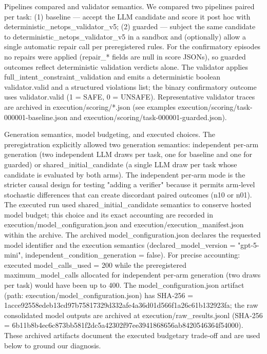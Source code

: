 \documentclass[conference]{IEEEtran}
\begin{document}
Pipelines compared and validator semantics. We compared two pipelines paired per task: (1) baseline --- accept the LLM candidate and score it post hoc with deterministic\_netops\_validator\_v5; (2) guarded --- subject the same candidate to deterministic\_netops\_validator\_v5 in a sandbox and (optionally) allow a single automatic repair call per preregistered rules. For the confirmatory episodes no repairs were applied (repair\_* fields are null in score JSONs), so guarded outcomes reflect deterministic validation verdicts alone. The validator applies full\_intent\_constraint\_validation and emits a deterministic boolean validator.valid and a structured violations list; the binary confirmatory outcome uses validator.valid (1 = SAFE, 0 = UNSAFE). Representative validator traces are archived in execution/scoring/*.json (see examples execution/scoring/task-000001-baseline.json and execution/scoring/task-000001-guarded.json).

Generation semantics, model budgeting, and executed choices. The preregistration explicitly allowed two generation semantics: independent per‑arm generation (two independent LLM draws per task, one for baseline and one for guarded) or shared\_initial\_candidate (a single LLM draw per task whose candidate is evaluated by both arms). The independent per‑arm mode is the stricter causal design for testing "adding a verifier" because it permits arm‑level stochastic differences that can create discordant paired outcomes (n10 or n01). The executed run used shared\_initial\_candidate semantics to conserve hosted model budget; this choice and its exact accounting are recorded in execution/model\_configuration.json and execution/execution\_manifest.json within the archive. The archived model\_configuration.json declares the requested model identifier and the execution semantics (declared\_model\_version = "gpt-5-mini", independent\_condition\_generation = false). For precise accounting: executed model\_calls\_used = 200 while the preregistered maximum\_model\_calls allocated for independent per‑arm generation (two draws per task) would have been up to 400. The model\_configuration.json artifact (path: execution/model\_configuration.json) has SHA‑256 = 1acce92558edeb13cd97b75817329d332afe4a36d01d566f1a26c61b132923fa; the raw consolidated model outputs are archived at execution/raw\_results.jsonl (SHA‑256 = 6b11b8b4ec6c873bb581f2dc5a42302f97ee3941868656ab8420546364f54000). These archived artifacts document the executed budgetary trade‑off and are used below to ground our diagnosis.
\end{document}
